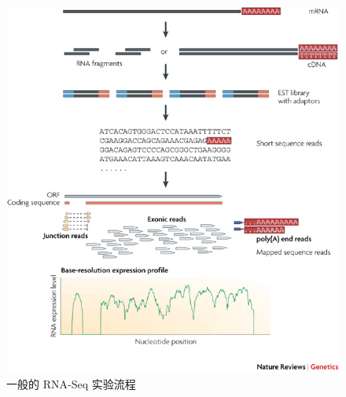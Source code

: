 \begin{figure}[!t]
\centering
\includegraphics[width=\textwidth]{figures/rna-seq-experiment.jpg}
\caption{一般的 RNA-Seq 实验流程 \cite{wang2009rna}}
\label{intro-rna-seq-ex}
\end{figure}

